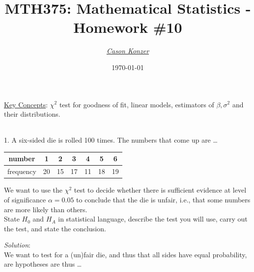 \documentclass[12pt]{article}
\newcommand{\XB}{\color{black}}
\newcommand{\XBB}{\color{blue}}
\newcommand{\XV}{\color{violet}}
\begin{document}
\title{\textbf{MTH375}: Mathematical Statistics - Homework \#10}
\date{\today}
\author{\XV\textit{\large{\href{https://github.com/casonk}{Cason Konzer}}}\XB}

\maketitle
\hrulefill
\vfill
    \underline{Key Concepts}: $ \chi^{2} $ test for goodness of fit, linear models, estimators of
    $ \beta, \sigma^{2} $ and their distributions.

\newpage
\newpage
\XBB\hrulefill\XB \\

1. A six-sided die is rolled 100 times. The numbers that come up are \dots \\

\begin{center}
    \begin{tabular}{ c||c|c|c|c|c|c }
     number    & 1  & 2  & 3  & 4  & 5  & 6  \\
     \hline
     frequency & 20 & 15 & 17 & 11 & 18 & 19 \\
    \end{tabular}
\end{center}

We want to use the $ \chi^{2} $ test to decide whether there is sufficient evidence at level of significance $ \alpha = 0.05 $
to conclude that the die is unfair, i.e., that some numbers are more likely than others. \\

State $ H_{0} $ and $ H_{A} $ in statistical language, describe the test you will use, carry out the test,
and state the conclusion. \\

\XBB\hrulefill\XB
\vspace{5mm}

\vspace{2.5mm}
\textit{Solution}:
\vspace{2.5mm} \\

\noindent
We want to test for a (un)fair die, and thus that all sides have equal probability, are hypotheses are thus \dots \\
\end{document}
